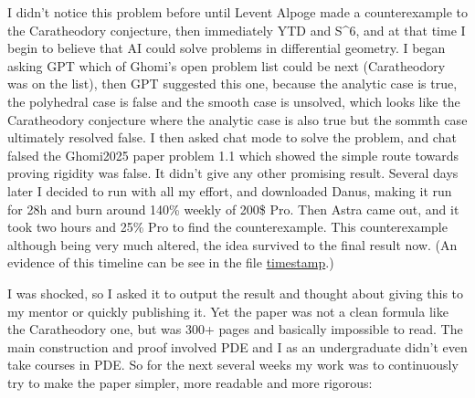 \documentclass[11pt]{amsart}
\theoremstyle{definition}
\theoremstyle{remark}
\numberwithin{equation}{section}
\begin{document}
I didn't notice this problem before until Levent Alpoge made a counterexample to the Caratheodory conjecture, then immediately YTD and S\textasciicircum{}6, and at that time I begin to believe that AI could solve problems in differential geometry. I began asking GPT which of Ghomi's open problem list could be next (Caratheodory was on the list), then GPT suggested this one, because the analytic case is true, the polyhedral case is false and the smooth case is unsolved, which looks like the Caratheodory conjecture where the analytic case is also true but the sommth case ultimately resolved false. I then asked chat mode to solve the problem, and chat falsed the Ghomi2025 paper problem 1.1 which showed the simple route towards proving rigidity was false. It didn't give any other promising result. Several days later I decided to run with all my effort, and downloaded Danus, making it run for 28h and burn around 140\% weekly of 200\$ Pro. Then Astra came out, and it took two hours and 25\% Pro to find the counterexample. This counterexample although being very much altered, the idea survived to the final result now. (An evidence of this timeline can be see in the file \href{https://github.com/zhangyuetong/smooth-tight-nonrigidity/blob/6a0758c99077e2c7fd31c3de6ee3452b3f6df8d3/timestamp/README.md}{timestamp}.)

I was shocked, so I asked it to output the result and thought about giving this to my mentor or quickly publishing it. Yet the paper was not a clean formula like the Caratheodory one, but was 300+ pages and basically impossible to read. The main construction and proof involved PDE and I as an undergraduate didn't even take courses in PDE. So for the next several weeks my work was to continuously try to make the paper simpler, more readable and more rigorous:
\end{document}
